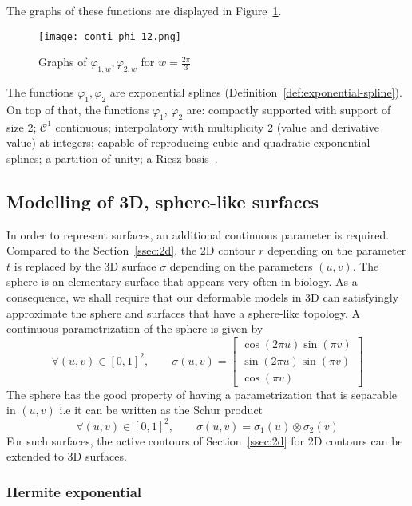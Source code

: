 The graphs of these functions are displayed in Figure~\ref{fig:conti_phi_12}.
\begin{figure}[!h]
  \centering
  \texttt{[image: conti\_phi\_12.png]}
  \caption{Graphs of $\varphi_{1,w}, \varphi_{2,w}$ for $w=\frac{2\pi}{3}$}\label{fig:conti_phi_12}
\end{figure}

The functions $\varphi_1, \varphi_2$ are exponential splines (Definition~\ref{def:exponential-spline}). On top of that, 
the functions $\varphi_1$, $\varphi_2$ are: compactly supported with support of size 2; $\mathcal{C}^1$ continuous; 
interpolatory with multiplicity 2 (value and derivative value) at integers; capable of reproducing cubic and quadratic 
exponential splines; a partition of unity; a Riesz basis~\cite{conti_ellipse-preserving_2015}.
 
\subsection{Modelling of 3D, sphere-like surfaces}

In order to represent surfaces, an additional continuous parameter is required. Compared to the Section~\ref{ssec:2d}, 
the 2D contour $r$ depending on the parameter $t$ is replaced by the 3D surface $\sigma$ depending on the parameters 
$(u,v)$. The sphere is an elementary surface that appears very often in biology. As a consequence, we shall require that 
our deformable models in 3D can satisfyingly approximate the sphere and surfaces that have a sphere-like topology.  A 
continuous  parametrization of the sphere is given by
\begin{equation*}
  \forall(u, v) \in {[0,1]}^2, \qquad \sigma(u,v) = \begin{bmatrix} \cos(2\pi u)\sin(\pi v) \\ \sin(2\pi u)\sin(\pi v) 
  \\ \cos(\pi v) \end{bmatrix}
\end{equation*}
The sphere has the good property of having a parametrization that is separable in $(u,v)$ i.e it can be written as the 
Schur product
\begin{equation*}
  \forall(u, v) \in {[0,1]}^2, \qquad \sigma(u,v) = \sigma_1(u) \otimes \sigma_2(v)
\end{equation*}
For such surfaces, the active contours of Section~\ref{ssec:2d} for 2D contours can be extended to 3D surfaces.  

\subsubsection{Hermite exponential}

